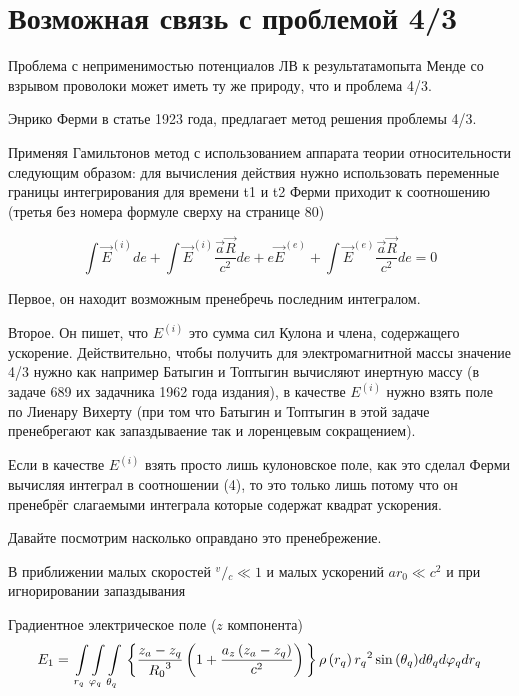 \documentclass[12pt]{article}
\begin{document}
\section{Возможная связь с проблемой 4/3}

Проблема с неприменимостью потенциалов ЛВ к результатамопыта Менде со взрывом проволоки может иметь ту же природу, что и проблема 4/3.

Энрико Ферми в статье \cite{Fermi1923} 1923 года, 
предлагает метод решения проблемы 4/3.

Применяя Гамильтонов метод с использованием аппарата теории относительности следующим образом: для вычисления действия нужно использовать переменные границы интегрирования для времени t1 и t2 Ферми приходит к соотношению (третья без номера формуле сверху на странице 80)

$$\int \vec E^{(i)} de + \int \vec E^{(i)}\frac{\vec a \vec R}{c^2} de + e \vec E^{(e)} + \int \vec E^{(e)}\frac{\vec a \vec R}{c^2} de = 0$$

Первое, он находит возможным пренебречь последним интегралом.

Второе. Он пишет, что $E^{(i)}$ это сумма сил Кулона и члена, содержащего ускорение. Действительно, чтобы получить для электромагнитной массы значение 4/3 нужно как например Батыгин и Топтыгин вычисляют инертную массу (в задаче 689 их задачника 1962 года издания), в качестве $E^{(i)}$ нужно взять поле по Лиенару Вихерту (при том что Батыгин и Топтыгин в этой задаче пренебрегают как запаздываение так и лоренцевым сокращением).

Если в качестве $E^{(i)}$ взять просто лишь кулоновское поле, как это сделал Ферми вычисляя интеграл в соотношении (4), то это только лишь потому что он пренебрёг слагаемыми интеграла которые содержат квадрат ускорения.

Давайте посмотрим насколько оправдано это пренебрежение.


В приближении малых скоростей ${}^{v} \big / {}_{c}\ll 1$  и малых ускорений $a{{r}_{0}}\ll {{c}^{2}}$ и при игнорировании запаздывания

Градиентное электрическое поле ($z$ компонента)
	\[{E}_{1}=\\
\int\limits_{{{r}_{q}}}\int\limits_{{{\varphi}_{q}}}\int\limits_{{{\theta}_{q}}}\\
\left\{ \frac{z_a-z_q}{{{R}_{0}}^3}\left( 1+\frac{a_z\left( {{z}_{a}}-{{z}_{q}} \right)}{c^2} \right) \\
 \right\}\\
{\rho \left( {{r}_{q}} \right){{r}_{q}}^{2}\sin \left( {{\theta }_{q}} \right)}\\
d{{\theta }_{q}}d{{\varphi }_{q}}d{{r}_{q}}\] 	
\end{document}

